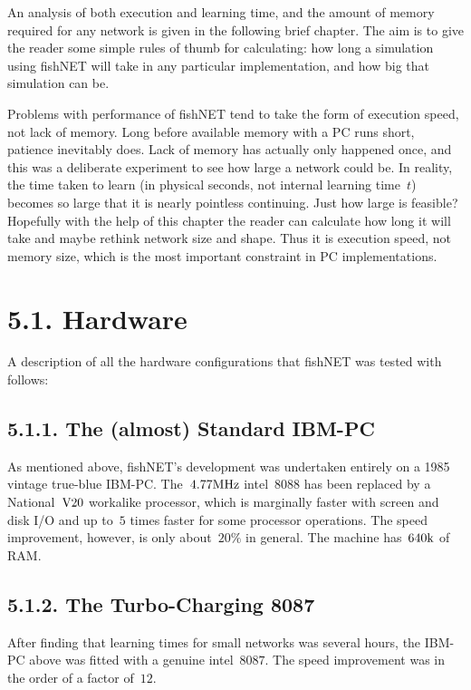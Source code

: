 \documentclass[12pt]{report}
\begin{document}
An analysis of both execution and learning time, and the amount of
memory required for any network is given in the following brief
chapter.
The aim is to give the reader some simple rules of thumb for
calculating: how long a simulation using fishNET will take in any
particular implementation, and how big that simulation can be.

Problems with performance of fishNET tend to take the form of
execution speed, not lack of memory.
Long before available memory with a PC runs short, patience
inevitably does.
Lack of memory has actually only happened once, and this was a
deliberate experiment to see how large a network could be.
In reality, the time taken to learn (in physical seconds, not
internal learning time~$t$) becomes so large that it is nearly
pointless continuing.
Just how large is feasible?
Hopefully with the help of this chapter the reader can calculate how
long it will take and maybe rethink network size and shape.
Thus it is execution speed, not memory size, which is the most
important constraint in PC implementations.

\section{5.1. Hardware}

A description of all the hardware configurations that fishNET was
tested with follows:

\subsection{5.1.1. The (almost) Standard IBM-PC}

As mentioned above, fishNET's development was undertaken entirely on
a 1985 vintage true-blue IBM-PC.
The~$4.77 {\rm MHz}$ intel~$8088$ has been replaced by a
National~${\rm V}20$ workalike processor, which is marginally faster
with screen and disk I/O and up to~$5$ times faster for some
processor operations.
The speed improvement, however, is only about~$20\%$ in general.
The machine has~$640{\rm k}$ of RAM.

\subsection{5.1.2. The Turbo-Charging 8087}

After finding that learning times for small networks was several
hours, the IBM-PC above was
fitted with a genuine intel~$8087$.
The speed improvement was in the order of a factor of~$12$.
\end{document}
